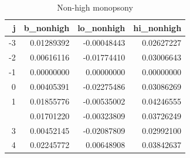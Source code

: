 \begin{table}

\caption{Non-high monopsony}
\centering
\begin{tabular}[t]{rrrr}
\toprule
j & b\_nonhigh & lo\_nonhigh & hi\_nonhigh\\
\midrule
-3 & 0.01289392 & -0.00048443 & 0.02627227\\
-2 & 0.00616116 & -0.01774410 & 0.03006643\\
-1 & 0.00000000 & 0.00000000 & 0.00000000\\
0 & 0.00405391 & -0.02275486 & 0.03086269\\
1 & 0.01855776 & -0.00535002 & 0.04246555\\
\addlinespace
2 & 0.01701220 & -0.00323809 & 0.03726249\\
3 & 0.00452145 & -0.02087809 & 0.02992100\\
4 & 0.02245772 & 0.00648908 & 0.03842637\\
\bottomrule
\end{tabular}
\end{table}
